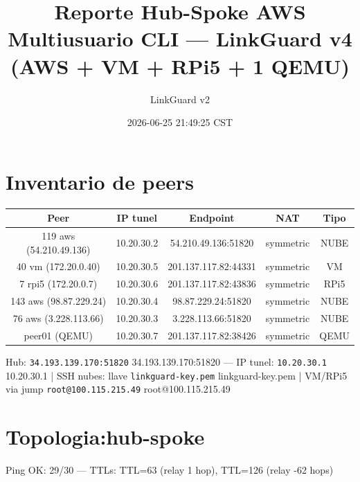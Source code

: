 \documentclass[11pt,a4paper]{article}
\title{Reporte Hub-Spoke AWS Multiusuario CLI — LinkGuard v4 (AWS + VM + RPi5 + 1 QEMU)}
\author{LinkGuard v2}
\date{2026-06-25 21:49:25 CST}
\begin{document}
\maketitle

\section{Inventario de peers}
\begin{longtable}{|c|c|c|c|c|}
\hline
Peer & IP tunel & Endpoint & NAT & Tipo \\ \hline
119 aws (54.210.49.136) & 10.20.30.2 & 54.210.49.136:51820 & symmetric & NUBE \\ \hline
40 vm (172.20.0.40) & 10.20.30.5 & 201.137.117.82:44331 & symmetric & VM \\ \hline
7 rpi5 (172.20.0.7) & 10.20.30.6 & 201.137.117.82:43836 & symmetric & RPi5 \\ \hline
143 aws (98.87.229.24) & 10.20.30.4 & 98.87.229.24:51820 & symmetric & NUBE \\ \hline
76 aws (3.228.113.66) & 10.20.30.3 & 3.228.113.66:51820 & symmetric & NUBE \\ \hline
peer01 (QEMU) & 10.20.30.7 & 201.137.117.82:38426 & symmetric & QEMU \\ \hline
\end{longtable}

Hub:  \texttt{34.193.139.170:51820} 34.193.139.170:51820  — IP tunel:  \texttt{10.20.30.1} 10.20.30.1  | SSH nubes: llave  \texttt{linkguard-key.pem} linkguard-key.pem  | VM/RPi5 via jump  \texttt{root@100.115.215.49} root@100.115.215.49\\

\section{Topologia:hub-spoke}
Ping OK: 29/30 — TTLs: TTL=63 (relay 1 hop), TTL=126 (relay -62 hops)\\
\end{document}
